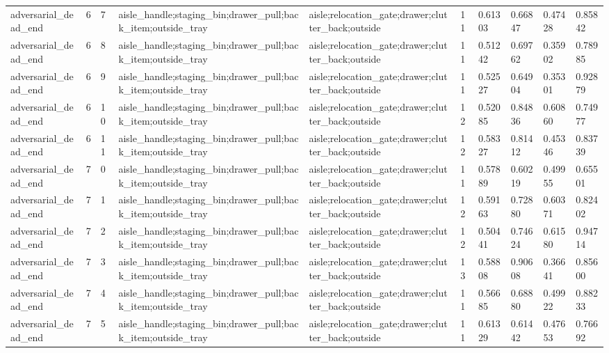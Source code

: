 \documentclass{article}
\begin{document}
\begin{table}[tbp]
{\begin{tabular}{llllllllll}
adversarial\_dead\_end & 6 & 7 & aisle\_handle;staging\_bin;drawer\_pull;back\_item;outside\_tray & aisle;relocation\_gate;drawer;clutter\_back;outside & 11 & 0.61303 & 0.66847 & 0.47428 & 0.85842 \\
adversarial\_dead\_end & 6 & 8 & aisle\_handle;staging\_bin;drawer\_pull;back\_item;outside\_tray & aisle;relocation\_gate;drawer;clutter\_back;outside & 11 & 0.51242 & 0.69762 & 0.35902 & 0.78985 \\
adversarial\_dead\_end & 6 & 9 & aisle\_handle;staging\_bin;drawer\_pull;back\_item;outside\_tray & aisle;relocation\_gate;drawer;clutter\_back;outside & 11 & 0.52527 & 0.64904 & 0.35301 & 0.92879 \\
adversarial\_dead\_end & 6 & 10 & aisle\_handle;staging\_bin;drawer\_pull;back\_item;outside\_tray & aisle;relocation\_gate;drawer;clutter\_back;outside & 12 & 0.52085 & 0.84836 & 0.60860 & 0.74977 \\
adversarial\_dead\_end & 6 & 11 & aisle\_handle;staging\_bin;drawer\_pull;back\_item;outside\_tray & aisle;relocation\_gate;drawer;clutter\_back;outside & 12 & 0.58327 & 0.81412 & 0.45346 & 0.83739 \\
adversarial\_dead\_end & 7 & 0 & aisle\_handle;staging\_bin;drawer\_pull;back\_item;outside\_tray & aisle;relocation\_gate;drawer;clutter\_back;outside & 11 & 0.57889 & 0.60219 & 0.49955 & 0.65501 \\
adversarial\_dead\_end & 7 & 1 & aisle\_handle;staging\_bin;drawer\_pull;back\_item;outside\_tray & aisle;relocation\_gate;drawer;clutter\_back;outside & 12 & 0.59163 & 0.72880 & 0.60371 & 0.82402 \\
adversarial\_dead\_end & 7 & 2 & aisle\_handle;staging\_bin;drawer\_pull;back\_item;outside\_tray & aisle;relocation\_gate;drawer;clutter\_back;outside & 12 & 0.50441 & 0.74624 & 0.61580 & 0.94714 \\
adversarial\_dead\_end & 7 & 3 & aisle\_handle;staging\_bin;drawer\_pull;back\_item;outside\_tray & aisle;relocation\_gate;drawer;clutter\_back;outside & 13 & 0.58808 & 0.90608 & 0.36641 & 0.85600 \\
adversarial\_dead\_end & 7 & 4 & aisle\_handle;staging\_bin;drawer\_pull;back\_item;outside\_tray & aisle;relocation\_gate;drawer;clutter\_back;outside & 11 & 0.56685 & 0.68880 & 0.49922 & 0.88233 \\
adversarial\_dead\_end & 7 & 5 & aisle\_handle;staging\_bin;drawer\_pull;back\_item;outside\_tray & aisle;relocation\_gate;drawer;clutter\_back;outside & 11 & 0.61329 & 0.61442 & 0.47653 & 0.76692 \\

\end{tabular}}
\end{table}
\end{document}
